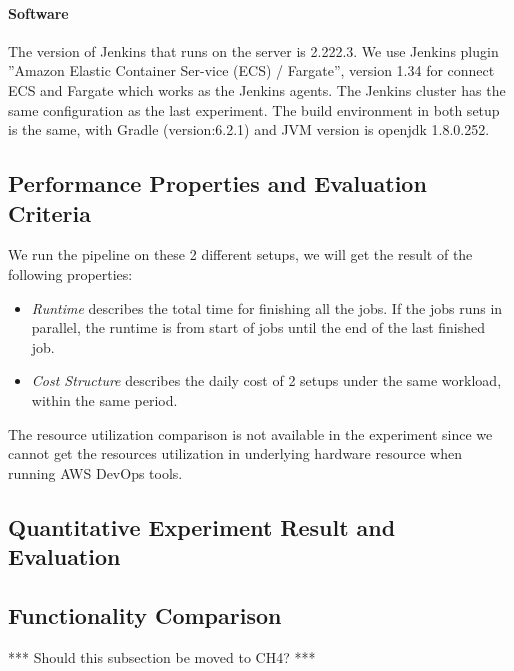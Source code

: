 \paragraph{Software}
The version of Jenkins that runs on the server is 2.222.3. We use Jenkins plugin ”Amazon Elastic Container Ser-vice (ECS) / Fargate”, version 1.34 for connect ECS and Fargate which works as the Jenkins agents. The Jenkins cluster has the same configuration as the last experiment. The build environment in both setup is the same, with Gradle (version:6.2.1) and JVM version is openjdk 1.8.0.252.
\subsection{Performance Properties and Evaluation Criteria}
We run the pipeline on these 2 different setups, we will get the result of the following properties:
\begin{itemize}
    \item \textit{Runtime} describes the total time for finishing all the jobs. If the jobs runs in parallel, the runtime is from start of jobs until the end of the last finished job.
    \item \textit{Cost Structure} describes the daily cost of 2 setups under the same workload, within the same period.
\end{itemize}
The resource utilization comparison is not available in the experiment since we cannot get the resources utilization in underlying hardware resource when running AWS DevOps tools.
\subsection{Quantitative Experiment Result and Evaluation}
\subsection{Functionality Comparison}
*** Should this subsection be moved to CH4? ***
